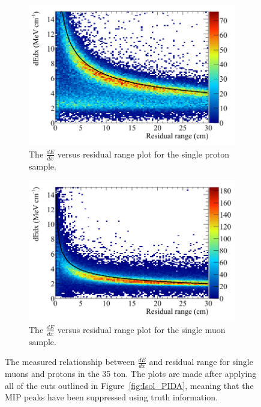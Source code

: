 \begin{figure}[h!]
  \centering
  \begin{subfigure}{0.48\textwidth}
        \centering
        \includegraphics[width=\textwidth]{IsolatedProtons_500V_Dec16_Proton_dEdx}
        \caption{The $\frac{dE}{dx}$ versus residual range plot for the single proton sample.}
        \label{fig:Isol_dEdx_Proton}
  \end{subfigure}%
  \hspace{0.03\textwidth}%
  \begin{subfigure}{0.48\textwidth}
        \centering
        \includegraphics[width=\textwidth]{IsolatedMuons_500V_Dec16_Muon_dEdx}
        \caption{The $\frac{dE}{dx}$ versus residual range plot for the single muon sample.}
        \label{fig:Isol_dEdx_Muon}
  \end{subfigure}
  \caption[The $\frac{dE}{dx}$ versus residual range plot for single muons and protons in the 35 ton.]
          {The measured relationship between $\frac{dE}{dx}$ and residual range for single muons and protons in the 35 ton. The plots are made after applying all of the cuts outlined in Figure~\ref{fig:Isol_PIDA}, meaning that the MIP peaks have been suppressed using truth information.}
  \label{fig:Isol_dEdx}
\end{figure}

